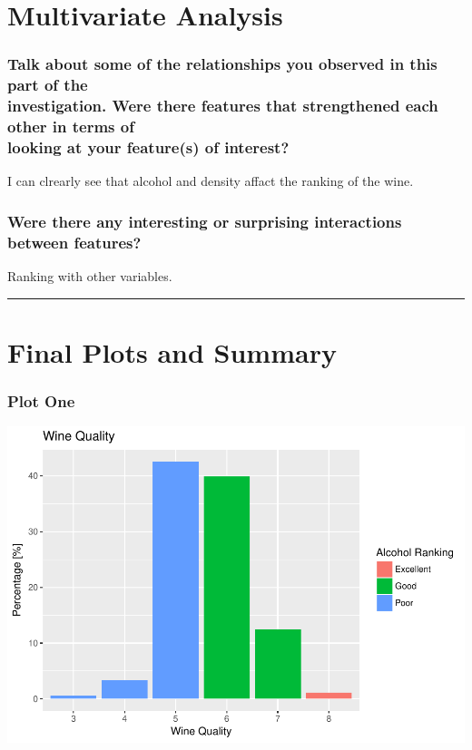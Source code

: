\documentclass[]{article}
\begin{document}
\section{Multivariate Analysis}\label{multivariate-analysis}

\subsubsection{\texorpdfstring{Talk about some of the relationships you
observed in this part of the\\
investigation. Were there features that strengthened each other in terms
of\\
looking at your feature(s) of
interest?}{Talk about some of the relationships you observed in this part of the investigation. Were there features that strengthened each other in terms of looking at your feature(s) of interest?}}\label{talk-about-some-of-the-relationships-you-observed-in-this-part-of-the-investigation.-were-there-features-that-strengthened-each-other-in-terms-of-looking-at-your-features-of-interest}

I can clrearly see that alcohol and density affact the ranking of the
wine.

\subsubsection{Were there any interesting or surprising interactions
between
features?}\label{were-there-any-interesting-or-surprising-interactions-between-features}

Ranking with other variables.

\begin{center}\rule{0.5\linewidth}{\linethickness}\end{center}

\section{Final Plots and Summary}\label{final-plots-and-summary}

\subsubsection{Plot One}\label{plot-one}

\includegraphics{RedWine_files/figure-latex/Plot_One-1.pdf}
\end{document}
